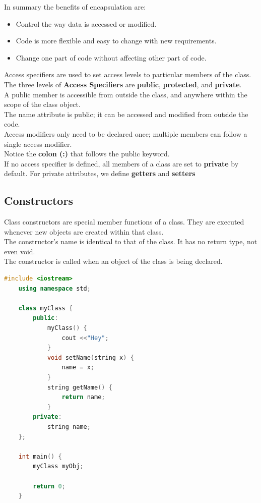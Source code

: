 \documentclass[12pt , a4paper]{article}
\begin{document}
	In summary the benefits of encapsulation are:\\
	\begin{itemize}
		\item Control the way data is accessed or modified.\\
		\item Code is more flexible and easy to change with new requirements.\\
		\item Change one part of code without affecting other part of code.\\
	\end{itemize}
	Access specifiers are used to set access levels to particular members of the class.\\
	The three levels of \textbf{Access Specifiers} are \textbf{public}, \textbf{protected}, and \textbf{private}.\\
	A public member is accessible from outside the class, and anywhere within the scope of the class object.\\
	The name attribute is public; it can be accessed and modified from outside the code.\\
	Access modifiers only need to be declared once; multiple members can follow a single access modifier.\\
	Notice the  \textbf{colon (:)} that follows the public keyword.\\
	If no access specifier is defined, all members of a class are set to \textbf{private} by default. For private attributes, we define \textbf{getters} and \textbf{setters}\\

	\subsection{Constructors}
	Class constructors are special member functions of a class. They are executed whenever new objects are created within that class.\\
	The constructor's name is identical to that of the class. It has no return type, not even void.\\
	The constructor is called when an object of the class is being declared.\\
	\begin{lstlisting}[language=C++]
	#include <iostream>
	using namespace std;
	
	class myClass {
	    public:
	        myClass() {
	            cout <<"Hey";
	        }
	        void setName(string x) {
	            name = x;
	        }
	        string getName() {
	            return name;
	        }
	    private:
	        string name;
	};
	
	int main() {
	    myClass myObj;
	
	    return 0;
	}

	\end{lstlisting}
\end{document}
